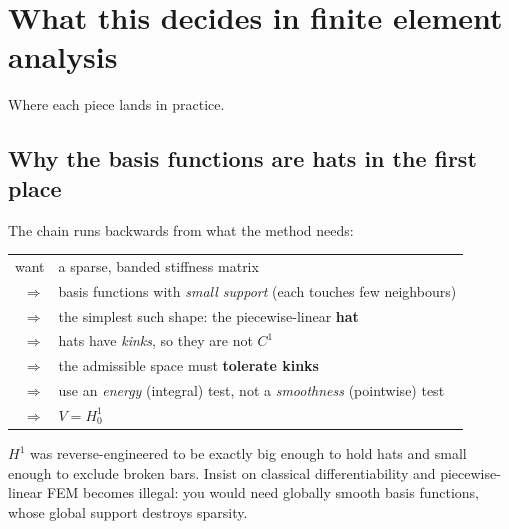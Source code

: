 \documentclass[11pt]{article}
\begin{document}
\section{What this decides in finite element analysis}

Where each piece lands in practice.

\subsection{Why the basis functions are hats in the first place}

The chain runs backwards from what the method needs:
\begin{center}\small
\renewcommand{\arraystretch}{1.2}
\begin{tabular}{@{}rl@{}}
\toprule
want & a sparse, banded stiffness matrix\\
$\Rightarrow$ & basis functions with \emph{small support} (each touches few neighbours)\\
$\Rightarrow$ & the simplest such shape: the piecewise-linear \textbf{hat}\\
$\Rightarrow$ & hats have \emph{kinks}, so they are not $C^{1}$\\
$\Rightarrow$ & the admissible space must \textbf{tolerate kinks}\\
$\Rightarrow$ & use an \emph{energy} (integral) test, not a \emph{smoothness} (pointwise) test\\
$\Rightarrow$ & $V=H^{1}_{0}$\\
\bottomrule
\end{tabular}
\end{center}

\noindent
$H^{1}$ was reverse-engineered to be exactly big enough to hold hats and small
enough to exclude broken bars. Insist on classical differentiability and
piecewise-linear FEM becomes illegal: you would need globally smooth basis
functions, whose global support destroys sparsity.
\end{document}
